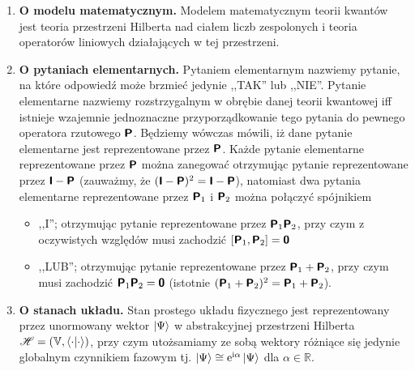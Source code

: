 \documentclass{myclass}
\begin{document}
\begin{enumerate}[label=\Roman*.]
    
    \item \textbf{O modelu matematycznym.} Modelem matematycznym teorii kwantów jest teoria
    przestrzeni Hilberta nad ciałem liczb zespolonych i teoria operatorów liniowych działających w
    tej przestrzeni.

    \item \textbf{O pytaniach elementarnych.} Pytaniem elementarnym nazwiemy pytanie, na które
    odpowiedź może brzmieć jedynie ,,TAK'' lub ,,NIE''. Pytanie elementarne nazwiemy rozstrzygalnym
    w obrębie danej teorii kwantowej iff istnieje wzajemnie jednoznaczne przyporządkowanie tego
    pytania do pewnego operatora rzutowego \(\boldsymbol{\mathsf{P}}\). Będziemy wówczas mówili, iż dane pytanie
    elementarne jest reprezentowane przez \(\boldsymbol{\mathsf{P}}\). Każde pytanie elementarne reprezentowane
    przez \(\boldsymbol{\mathsf{P}}\) można zanegować otrzymując pytanie reprezentowane przez \(\boldsymbol{\mathsf{I}} -
    \boldsymbol{\mathsf{P}}\) (zauważmy, że \((\boldsymbol{\mathsf{I}} - \boldsymbol{\mathsf{P}})^2 = \boldsymbol{\mathsf{I}} - \boldsymbol{\mathsf{P}}\)), natomiast dwa
    pytania elementarne reprezentowane przez \(\boldsymbol{\mathsf{P}}_1\) i \(\boldsymbol{\mathsf{P}}_2\) można połączyć
    spójnikiem
    \begin{itemize}
        \item ,,I''; otrzymując pytanie reprezentowane przez \(\boldsymbol{\mathsf{P}}_1\boldsymbol{\mathsf{P}}_2\), przy czym z
        oczywistych względów musi zachodzić \([\boldsymbol{\mathsf{P}}_1, \boldsymbol{\mathsf{P}}_2] = \boldsymbol{\mathsf{\mathsf{0}}}\)

        \item ,,LUB''; otrzymując pytanie reprezentowane przez \(\boldsymbol{\mathsf{P}}_1 + \boldsymbol{\mathsf{P}}_2\), przy
        czym musi zachodzić \(\boldsymbol{\mathsf{P}}_1\boldsymbol{\mathsf{P}}_2 = \boldsymbol{\mathsf{\mathsf{0}}}\) (istotnie \((\boldsymbol{\mathsf{P}}_1 +
        \boldsymbol{\mathsf{P}}_2)^2 = \boldsymbol{\mathsf{P}}_1 + \boldsymbol{\mathsf{P}}_2 \)).

    \end{itemize}

    \item \textbf{O stanach układu.} Stan prostego układu fizycznego jest reprezentowany przez
    unormowany wektor \(\ket{\Psi}\) w abstrakcyjnej przestrzeni Hilberta \(\mathscr{H} =
    (\mathbb{V}, \braket{\cdot})\), przy czym utożsamiamy ze sobą wektory różniące się jedynie
    globalnym czynnikiem fazowym tj. \(\ket{\Psi} \cong \mathrm{e}^{\mathrm{i}\alpha}\ket{\Psi}\) dla \(\alpha \in
    \mathbb{R}\).


\end{enumerate}
\end{document}
